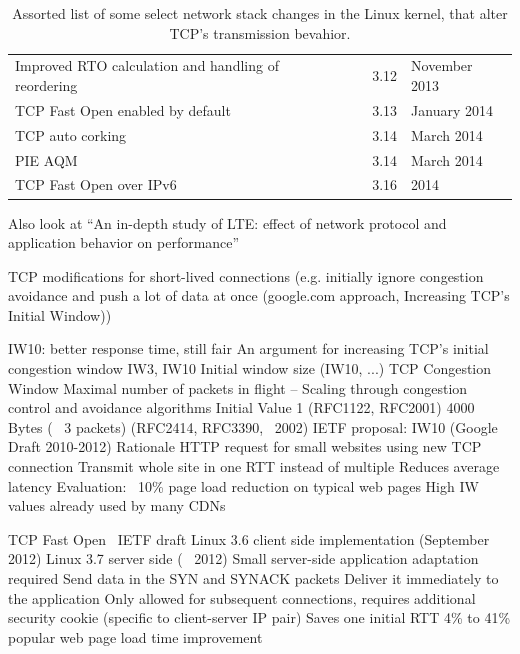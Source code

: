 \begin{table}[htb]
\begin{tabu}{X[1.4]XX[0.4]X[0.7]}
	Improved RTO calculation and handling of reordering & & 3.12 & November 2013 \\ %
	TCP Fast Open enabled by default & & 3.13 & January 2014 \\
	TCP auto corking & & 3.14 & March 2014 \\ %
	PIE AQM & & 3.14 & March 2014 \\ %
	TCP Fast Open over IPv6 & & 3.16 & 2014 \\


	\bottomrule
	\end{tabu}
	\caption{Assorted list of some select network stack changes in the Linux kernel, that alter \gls{TCP}'s transmission bevahior.}
\label{c5:tab:linux-stack-changes}
\end{table}

Also look at ``An in-depth study of LTE: effect of network protocol and application behavior on performance'' \cite{Huang:2013:ISL:2486001.2486006}

TCP modifications for short-lived connections (e.g. initially ignore congestion avoidance and push a lot of data at once (google.com approach, Increasing TCP's Initial Window)) 

IW10: better response time, still fair \cite{rfc6928}
An argument for increasing \gls{TCP}'s initial congestion window \cite{dukkipati2010argument}
IW3, IW10  Initial window size (IW10, ...)
 TCP Congestion Window
	Maximal number of packets in flight
–	Scaling through congestion control and avoidance algorithms
 Initial Value
	1 (RFC1122, RFC2001)
	4000 Bytes (~ 3 packets) (RFC2414, RFC3390, ~2002)
	IETF proposal: IW10 (Google Draft 2010-2012)
 Rationale
	HTTP request for small websites using new TCP connection
	Transmit whole site in one RTT instead of multiple
	Reduces average latency
		Evaluation: ~10\% page load reduction on typical web pages
	High IW values already used by many CDNs



TCP Fast Open~\cite{cheng2014tcptfo}
 IETF draft
 Linux 3.6 client side implementation (September 2012)
 Linux 3.7 server side (~ 2012)
 Small server-side application adaptation required
 Send data in the SYN and SYNACK packets
	Deliver it immediately to the application
	Only allowed for subsequent connections, requires additional security cookie (specific to client-server IP pair)
 Saves one initial RTT
 4\% to 41\% popular web page load time improvement


